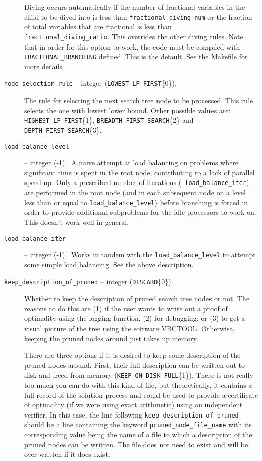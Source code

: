 \begin{description}
Diving occurs automatically if the number of fractional variables in
the child to be dived into is less than {\tt fractional\_diving\_num}
or the fraction of total variables that are fractional is less than {\tt
fractional\_diving\_ratio}. This overrides the other diving rules.
Note that in order for this option to work, the code must be compiled
with {\tt FRACTIONAL\_BRANCHING} defined. This is the default. See the
Makefile for more details.

\item[{\tt node\_selection\_rule} -- integer ({\tt LOWEST\_LP\_FIRST}\{0\}).]
The rule for selecting the next search tree node to be processed. This rule
selects the one with lowest lower bound. Other possible values are: {\tt
HIGHEST\_LP\_FIRST}\{1\}, {\tt BREADTH\_FIRST\_SEARCH}\{2\} and {\tt
DEPTH\_FIRST\_SEARCH}\{3\}.

\item[{\tt load\_balance\_level}] -- integer (-1).]
A naive attempt at load balancing on problems where significant time
is spent in the root node, contributing to a lack of parallel
speed-up. Only a prescribed number of iterations ({\tt
load\_balance\_iter}) are performed in the root node (and in each
subsequent node on
a level less than or equal to {\tt load\_balance\_level}) before
branching is forced in order to provide additional subproblems for the
idle processors to work on. This doesn't work well in general.

\item[{\tt load\_balance\_iter}] -- integer (-1).]
Works in tandem with the {\tt load\_balance\_level} to attempt some
simple load balancing. See the above description.

\item[{\tt keep\_description\_of\_pruned} -- integer ({\tt DISCARD}\{0\}).]
Whether to keep the description of pruned search tree nodes or not.
The reasons to do this are (1) if the user wants to write out a proof
of optimality using the logging function, (2) for debugging, or (3) to
get a visual picture of the tree using the software VBCTOOL.
Otherwise, keeping the pruned nodes around just takes up memory. 

There are three options if it is desired to keep some description of
the pruned nodes around. First, their full description can be written
out to disk and freed from memory ({\tt KEEP\_ON\_DISK\_FULL}\{1\}). There
is not really too much you can do with this kind of file, but
theoretically, it contains a full record of the solution process and
could be used to provide a certificate of optimality (if we were using
exact arithmetic) using an independent verifier. In this case, the
line following {\tt keep\_description\_of\_pruned} should be a line
containing the keyword {\tt pruned\_node\_file\_name} with its
corresponding value being the name of a file to which a description of
the pruned nodes can be written. The file does not need to exist and
will be over-written if it does exist.


\end{description}
